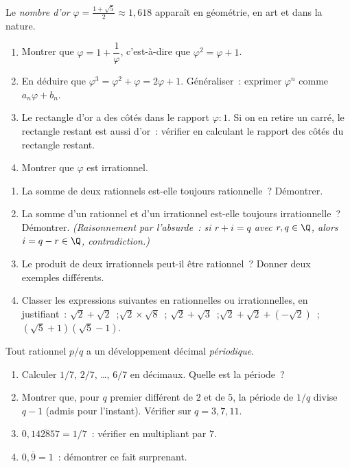 \begin{challenge}
Le \emph{nombre d'or} $\varphi = \frac{1+\sqrt{5}}{2} \approx 1{,}618$ appara\^it
en g\'eom\'etrie, en art et dans la nature.
\begin{enumerate}
  \item Montrer que $\varphi = 1 + \dfrac{1}{\varphi}$,
        c'est-\`a-dire que $\varphi^2 = \varphi + 1$.
  \item En d\'eduire que $\varphi^3 = \varphi^2 + \varphi = 2\varphi + 1$.
        G\'en\'eraliser~: exprimer $\varphi^n$ comme $a_n\varphi + b_n$.
  \item Le rectangle d'or a des c\^ot\'es dans le rapport $\varphi:1$.
        Si on en retire un carr\'e, le rectangle restant est aussi d'or~:
        v\'erifier en calculant le rapport des c\^ot\'es du rectangle restant.
  \item Montrer que $\varphi$ est irrationnel.
\end{enumerate}
\end{challenge}

\begin{challenge}
\begin{enumerate}
  \item La somme de deux rationnels est-elle toujours rationnelle~?
        D\'emontrer.
  \item La somme d'un rationnel et d'un irrationnel est-elle toujours
        irrationnelle~? D\'emontrer.
        \emph{(Raisonnement par l'absurde~: si $r + i = q$ avec $r, q \in \Q$,
        alors $i = q - r \in \Q$, contradiction.)}
  \item Le produit de deux irrationnels peut-il \^etre rationnel~?
        Donner deux exemples diff\'erents.
  \item Classer les expressions suivantes en rationnelles ou irrationnelles,
        en justifiant~:
        $\sqrt{2}+\sqrt{2}$~;\quad $\sqrt{2}\times\sqrt{8}$~;\quad
        $\sqrt{2}+\sqrt{3}$~;\quad $\sqrt{2}+\sqrt{2}+(-\sqrt{2})$~;\quad
        $(\sqrt{5}+1)(\sqrt{5}-1)$.
\end{enumerate}
\end{challenge}

\begin{challenge}
Tout rationnel $p/q$ a un d\'eveloppement d\'ecimal \emph{p\'eriodique}.
\begin{enumerate}
  \item Calculer $1/7$, $2/7$, \ldots, $6/7$ en d\'ecimaux.
        Quelle est la p\'eriode~?
  \item Montrer que, pour $q$ premier diff\'erent de $2$ et de $5$, la p\'eriode de $1/q$ divise $q-1$
        (admis pour l'instant).
        V\'erifier sur $q = 3, 7, 11$.
  \item $0{,}\overline{142857} = 1/7$~: v\'erifier en multipliant par $7$.
  \item $0{,}\overline{9} = 1$~: d\'emontrer ce fait surprenant.
\end{enumerate}
\end{challenge}

